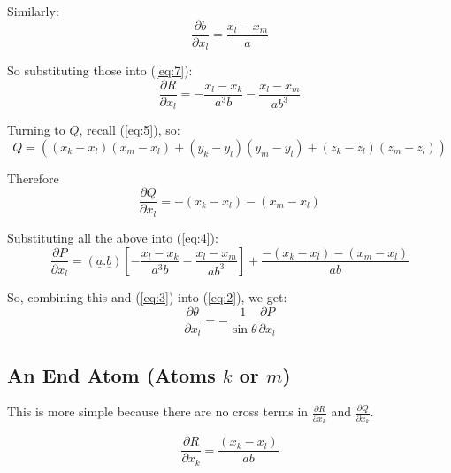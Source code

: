 Similarly:
\begin{displaymath}
  \frac{\partial b}{\partial x_l} = \frac{x_l-x_m}{a}
\end{displaymath}

So substituting those into (\ref{eq:7}):
\begin{displaymath}
  \frac{\partial R}{\partial x_l} = -\frac{x_l-x_k}{a^3b} -\frac{x_l-x_m}{ab^3}
\end{displaymath}

Turning to $Q$, recall (\ref{eq:5}), so: 
\begin{displaymath}
  Q =  
  ((x_k-x_l)(x_m-x_l) + (y_k-y_l)(y_m-y_l) + (z_k-z_l)(z_m-z_l))
\end{displaymath}

Therefore
\begin{displaymath}
   \frac{\partial Q}{\partial x_l} = -(x_k-x_l) -(x_m-x_l)
\end{displaymath}

Substituting all the above into (\ref{eq:4}):
\begin{displaymath}
  \frac{\partial P}{\partial x_l} = ({\underline a}.{\underline b})[-\frac{x_l-x_k}{a^3b} -\frac{x_l-x_m}{ab^3}] + \frac{-(x_k-x_l)-(x_m-x_l)}{ab}
\end{displaymath}

So, combining this and (\ref{eq:3}) into (\ref{eq:2}), we get: 
\begin{displaymath}
  \frac{\partial \theta}{\partial x_l} = -\frac{1}{\sin \theta}  \frac{\partial P}{\partial x_l} 
\end{displaymath}







\subsection{An End Atom (Atoms $k$ or $m$)}
This is more simple because there are no cross terms in 
$\frac{\partial R}{\partial x_k}$ and $\frac{\partial Q}{\partial x_k}$.

\begin{displaymath}
  \frac{\partial R}{\partial x_k} = \frac{(x_k-x_l)}{ab}
\end{displaymath}

